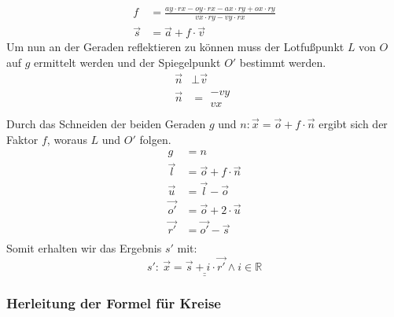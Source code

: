 \documentclass[reducespace,stylepage,semiarbeit]{spezidoc}
\begin{document}
\begin{equation*}
\begin{split}
f &= \frac{ay \cdot rx - oy \cdot rx - ax \cdot ry + ox \cdot ry}{vx \cdot ry - vy \cdot rx} \\
\vec{s} &= \vec{a} + f \cdot \vec{v}
\end{split}
\end{equation*}
Um nun an der Geraden reflektieren zu können muss der Lotfußpunkt $L$ von $O$ auf $g$ ermittelt werden und der Spiegelpunkt $O'$ bestimmt werden.
\begin{equation*}
\begin{split}
\vec{n} &\bot \vec{v} \\
\vec{n} &= \begin{matrix} -vy \\ vx \end{matrix} \\
\end{split}
\end{equation*}
Durch das Schneiden der beiden Geraden $g$ und $n: \vec{x} = \vec{o} + f \cdot \vec{n}$ ergibt sich der Faktor $f$, woraus $L$ und $O'$ folgen.
\begin{equation*}
\begin{split}
g &= n \\
\vec{l} &= \vec{o} + f \cdot \vec{n} \\
\vec{u} &= \vec{l} - \vec{o} \\
\vec{o'} &= \vec{o} + 2 \cdot \vec{u} \\
\vec{r'} &= \vec{o'} - \vec{s} \\
\end{split}
\end{equation*}
Somit erhalten wir das Ergebnis $s'$ mit:
\begin{equation*}
\underline{\underline{s':~ \vec{x} = \vec{s} + i \cdot \vec{r'} \wedge i \in \mathds{R}}}
\end{equation*}

\newpage
\subsubsection*{Herleitung der Formel für Kreise}
\end{document}
